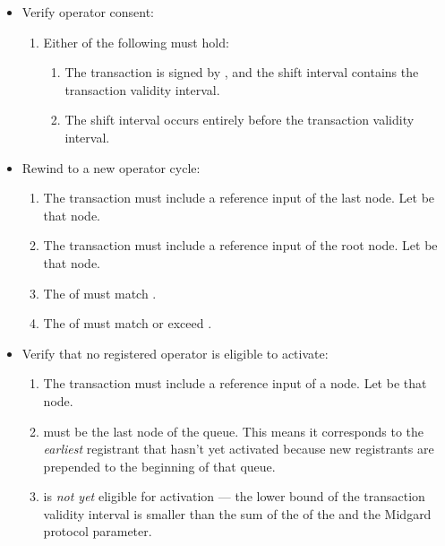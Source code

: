 \documentclass[../midgard.tex]{subfiles}
\begin{document}
\begin{description}
\begin{itemize}
            \item Verify operator consent:
            \begin{enumerate}[resume]
                \item Either of the following must hold:
                \begin{enumerate}
                    \item The transaction is signed by , and the  shift interval contains the transaction validity interval.
                    \item The  shift interval occurs entirely before the transaction validity interval.
                \end{enumerate}
            \end{enumerate}
            
            \item Rewind to a new operator cycle:
            \begin{enumerate}[resume]
                \item The transaction must include a reference input of the last  node.
                  Let  be that node.
                \item The transaction must include a reference input of the root  node.
                  Let  be that node.
                \item The  of  must match .
                \item The  of  must match or exceed .
            \end{enumerate}
            
            \item Verify that no registered operator is eligible to activate:
            \begin{enumerate}[resume]
                \item The transaction must include a reference input of a  node.
                  Let  be that node.
                \item {} must be the last node of the  queue.
                  This means it corresponds to the \emph{earliest} registrant that hasn't yet activated because new registrants are prepended to the beginning of that queue.
                \item {} is \emph{not yet} eligible for activation --- the lower bound of the transaction validity interval is smaller than the sum of the  of the  and the Midgard  protocol parameter.
            \end{enumerate}
        \end{itemize}
\end{description}
\end{document}
